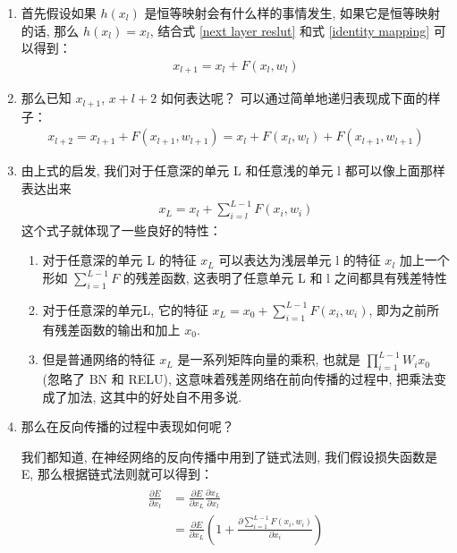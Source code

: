 \documentclass[12pt]{ctexart}%
\begin{document}
			\begin{enumerate}
				\item 首先假设如果 $h(x_l)$ 是恒等映射会有什么样的事情发生, 如果它是恒等映射的话, 那么 $h(x_l) = x_l$, 结合式 \ref{next layer reslut} 和式 \ref{identity mapping} 可以得到：
					\begin{align}
						x_{l+1} = x_l + F(x_l, w_l) \label{previous and next}
					\end{align}
					
				\item 那么已知 $x_{l+1}$, $x+{l+2}$ 如何表达呢？ 可以通过简单地递归表现成下面的样子：
					\begin{align}
						x_{l+2} = x_{l+1} + F(x_{l+1}, w_{l+1}) = x_l + F(x_l, w_l) + F(x_{l+1}, w_{l+1})
					\end{align}
					
				\item 由上式的启发, 我们对于任意深的单元 L 和任意浅的单元 l 都可以像上面那样表达出来
					\begin{align}
						x_L = x_l + \sum_{i=l}^{L-1} F(x_i, w_i) \label{the relationship between any unit}
					\end{align}
					这个式子就体现了一些良好的特性：
						\begin{enumerate}
							\item 对于任意深的单元 L 的特征 $x_L$ 可以表达为浅层单元 l 的特征 $x_l$ 加上一个形如 $\sum_{i=1}^{L-1} F$ 的残差函数, 这表明了任意单元 L 和 l 之间都具有残差特性
							
							\item 对于任意深的单元L, 它的特征 $x_L = x_0 + \sum_{i=1}^{L-1} F(x_i, w_i)$, 即为之前所有残差函数的输出和加上 $x_0$. 
							
							\item 但是普通网络的特征 $x_L$ 是一系列矩阵向量的乘积, 也就是 $\prod_{i=1}^{L-1} W_i x_0$ (忽略了 BN 和 RELU), 这意味着残差网络在前向传播的过程中, 把乘法变成了加法, 这其中的好处自不用多说. 
						\end{enumerate}
					
				\item 那么在反向传播的过程中表现如何呢？ 
				
						我们都知道, 在神经网络的反向传播中用到了链式法则, 我们假设损失函数是 E, 那么根据链式法则就可以得到：
							\begin{align}
								\begin{split}
									\frac{\partial E}{\partial x_l} &= \frac{\partial E}{\partial x_L} \frac{\partial x_L}{\partial x_l} \\
									&= \frac{\partial E}{\partial x_L} \left( 1 + \frac{\partial \sum_{i=1}^{L-1} F(x_i, w_i)}{\partial x_i} \right)
								\end{split} \label{backpropagation}
							\end{align}
							

\end{enumerate}
\end{document}
